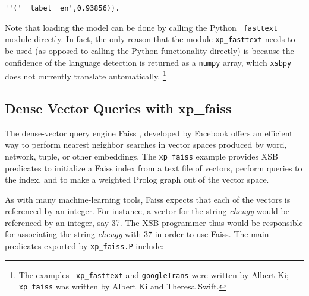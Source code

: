 \begin{verbatim}
''('__label__en',0.93856)}.
\end{verbatim}

Note that loading the model can be done by calling the Python {\tt
  fasttext} module directly.  In fact, the only reason that the module
{\tt xp\_fasttext} needs to be used (as opposed to calling the Python
functionality directly) is because the confidence of the language
detection is returned as a {\tt numpy} array, which {\tt xsbpy} does
not currently translate automatically. \footnote{The examples {\tt
    xp\_fasttext} and {\tt googleTrans} were written by Albert Ki;
  {\tt xp\_faiss} was written by Albert Ki and Theresa Swift.}

\subsection{Dense Vector Queries with xp\_faiss}
The dense-vector query engine Faiss \cite{JDH17}, developed by
Facebook offers an efficient way to perform nearest neighbor searches
in vector spaces produced by word, network, tuple, or other
embeddings.  The {\tt xp\_faiss} example provides XSB predicates to
initialize a Faiss index from a text file of vectors, perform queries
to the index, and to make a weighted Prolog graph out of the vector
space.  

As with many machine-learning tools, Faiss expects that each of the
vectors is referenced by an integer.  For instance, a vector for the
string {\em cheugy} would be referenced by an integer, say 37.  The
XSB programmer thus would be responsible for associating the string
{\em cheugy} with 37 in order to use Faiss.  The main predicates
exported by {\tt xp\_faiss.P} include:

